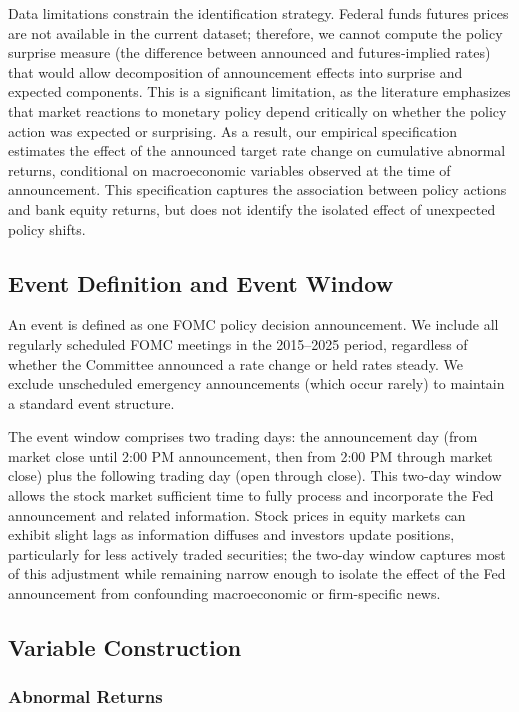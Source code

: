 \documentclass{article}
\begin{document}
Data limitations constrain the identification strategy. Federal funds futures prices are not available in the current dataset; therefore, we cannot compute the policy surprise measure (the difference between announced and futures-implied rates) that would allow decomposition of announcement effects into surprise and expected components. This is a significant limitation, as the literature emphasizes that market reactions to monetary policy depend critically on whether the policy action was expected or surprising. As a result, our empirical specification estimates the effect of the announced target rate change on cumulative abnormal returns, conditional on macroeconomic variables observed at the time of announcement. This specification captures the association between policy actions and bank equity returns, but does not identify the isolated effect of unexpected policy shifts.

\subsection{Event Definition and Event Window}

An event is defined as one FOMC policy decision announcement. We include all regularly scheduled FOMC meetings in the 2015--2025 period, regardless of whether the Committee announced a rate change or held rates steady. We exclude unscheduled emergency announcements (which occur rarely) to maintain a standard event structure.

The event window comprises two trading days: the announcement day (from market close until 2:00 PM announcement, then from 2:00 PM through market close) plus the following trading day (open through close). This two-day window allows the stock market sufficient time to fully process and incorporate the Fed announcement and related information. Stock prices in equity markets can exhibit slight lags as information diffuses and investors update positions, particularly for less actively traded securities; the two-day window captures most of this adjustment while remaining narrow enough to isolate the effect of the Fed announcement from confounding macroeconomic or firm-specific news.

\subsection{Variable Construction}

\subsubsection{Abnormal Returns}
\end{document}
